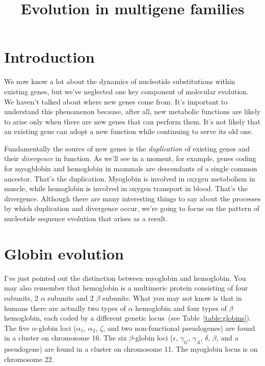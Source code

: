 \documentclass[12pt]{article}
\title{Evolution in multigene families}
\begin{document}
\maketitle

\thispagestyle{first}

\section*{Introduction}

We now know a lot about the dynamics of nucleotide substitutions
within existing genes, but we've neglected one key component of
molecular evolution. We haven't talked about where new genes come
from. It's important to understand this phenomenon because, after all,
new metabolic functions are likely to arise only when there are new
genes that can perform them. It's not likely that an existing gene can
adopt a new function while continuing to serve its old one.

Fundamentally the source of new genes is the {\it duplication\/} of
existing genes and their {\it divergence\/} in function. As we'll see
in a moment, for example, genes coding for myogblobin and hemoglobin
in mammals are descendants of a single common ancestor. That's the
duplication. Myoglobin is involved in oxygen metabolism in muscle,
while hemoglobin is involved in oxygen transport in blood. That's the
divergence. Although there are many interesting things to say about
the processes by which duplication and divergence occur, we're going
to focus on the pattern of nucleotide sequence evolution that arises
as a result.

\section*{Globin evolution}

I've just pointed out the distinction between myoglobin and
hemoglobin. You may also remember that hemoglobin is a multimeric
protein consisting of four subunits, 2 $\alpha$ subunits and 2 $\beta$
subunits. What you may not know is that in humans there are actually
two types of $\alpha$ hemoglobin and four types of $\beta$ hemoglobin,
each coded by a different genetic locus~(see
Table~\ref{table:globins}). The five $\alpha$-globin loci ($\alpha_1$,
$\alpha_2$, $\zeta$, and two non-functional pseudogenes) are found in a
cluster on chromosome 16. The six $\beta$-globin loci ($\epsilon$,
$\gamma_G$, $\gamma_A$, $\delta$, $\beta$, and a pseudogene) are found
in a cluster on chromosome 11. The myoglobin locus is on chromosome
22.
\end{document}
